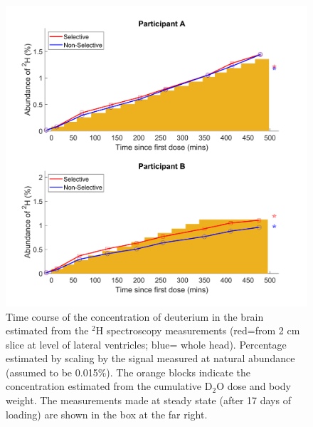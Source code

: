 \documentclass[class=article, crop=false]{standalone}
\begin{document}
\begin{figure}
    \centering
    \includegraphics[width=1\textwidth]{Figures/D2O/Bulk_Graph.png}
    \caption{Time course of the concentration of deuterium in the brain estimated from the $^2$H spectroscopy measurements (red=from 2 cm slice at level of lateral ventricles; blue= whole head). Percentage estimated by scaling by the signal measured at natural abundance (assumed to be 0.015\%). The orange blocks indicate the concentration estimated from the cumulative D$_2$O dose and body weight. The measurements made at steady state (after 17 days of loading) are shown in the box at the far right.}
    \label{fig:D2O:Bulk}
\end{figure}
\end{document}
